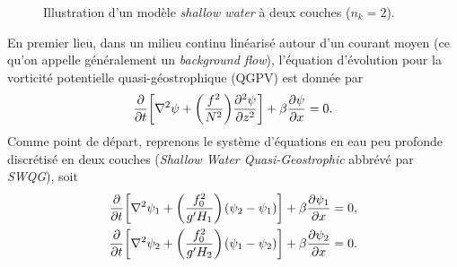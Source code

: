 \documentclass[10pt]{report}
\numberwithin{equation}{section}
\newcommand{\pt}{\hspace{1pt}} %
\begin{document}
\begin{figure}
\begin{center}
\vspace{-\baselineskip}
\end{center}
\caption{\label{org1354bd6}Illustration d'un modèle \textit{shallow water} à deux couches (\(n_k = 2\)).}
\end{figure}

En premier lieu, dans un milieu continu linéarisé autour d'un courant moyen (ce qu'on appelle généralement un \emph{background flow}), l'équation d'évolution pour la vorticité potentielle quasi-géostrophique (QGPV) est donnée par
\begin{equation}
\label{eq:orgaaf7a7d}
   \pdv{}{t} \qty[\laplacian\psi + \qty(\frac{f^2}{N^2})\pdv[2]{\psi}{z}] + \beta \pdv{\psi}{x} = 0.
\end{equation}
Comme point de départ, reprenons le système d'équations en eau peu profonde discrétisé en deux couches (\emph{Shallow Water Quasi-Geostrophic} abbrévé par \emph{SWQG}), soit
\begin{subequations}
\label{eq:orgb03b94d}
\begin{align}
   &\pdv{}{t} \qty[\laplacian\psi_1 + \qty(\frac{f_0^2}{g'H_1}) \pt(\psi_2 - \psi_1)] + \beta \pdv{\psi_1}{x} = 0,\\
   &\pdv{}{t} \qty[\laplacian\psi_2 + \qty(\frac{f_0^2}{g'H_2}) \pt(\psi_1 - \psi_2)] + \beta \pdv{\psi_2}{x} = 0.
\end{align}
\end{subequations}
\end{document}

